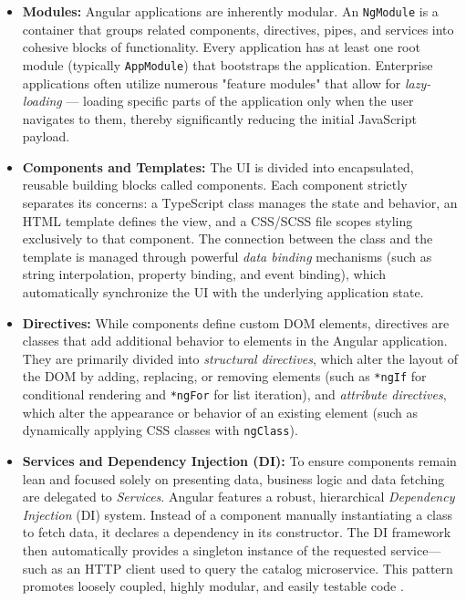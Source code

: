 \begin{itemize}
    \item \textbf{Modules:} Angular applications are inherently modular. An \texttt{NgModule} is a container that groups related components, directives, pipes, and services into cohesive blocks of functionality. Every application has at least one root module (typically \texttt{AppModule}) that bootstraps the application. Enterprise applications often utilize numerous "feature modules" that allow for \textit{lazy-loading} — loading specific parts of the application only when the user navigates to them, thereby significantly reducing the initial JavaScript payload.

    \item \textbf{Components and Templates:} The \gls{UI} is divided into encapsulated, reusable building blocks called components. Each component strictly separates its concerns: a TypeScript class manages the state and behavior, an HTML template defines the view, and a CSS/SCSS file scopes styling exclusively to that component. The connection between the class and the template is managed through powerful \textit{data binding} mechanisms (such as string interpolation, property binding, and event binding), which automatically synchronize the \gls{UI} with the underlying application state.

    \item \textbf{Directives:} While components define custom \gls{DOM} elements, directives are classes that add additional behavior to elements in the Angular application. They are primarily divided into \textit{structural directives}, which alter the layout of the \gls{DOM} by adding, replacing, or removing elements (such as \texttt{*ngIf} for conditional rendering and \texttt{*ngFor} for list iteration), and \textit{attribute directives}, which alter the appearance or behavior of an existing element (such as dynamically applying CSS classes with \texttt{ngClass}).
    
    \item \textbf{Services and Dependency Injection (DI):} To ensure components remain lean and focused solely on presenting data, business logic and data fetching are delegated to \textit{Services}. Angular features a robust, hierarchical \textit{Dependency Injection} (\gls{DI}) system. Instead of a component manually instantiating a class to fetch data, it declares a dependency in its constructor. The \gls{DI} framework then automatically provides a singleton instance of the requested service—such as an HTTP client used to query the catalog microservice. This pattern promotes loosely coupled, highly modular, and easily testable code \cite{angular_dev_overview}.
\end{itemize}

